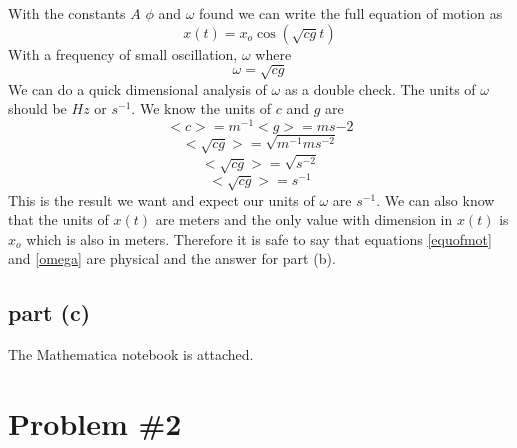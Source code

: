 \documentclass[11pt]{article}
\numberwithin{equation}{section}
\begin{document}
With the constants $A$ $\phi$ and $\omega$ found we can write the full equation of motion as
\begin{equation}
x(t) = x_o\cos{(\sqrt{cg}t)}
\label{equofmot}
\end{equation}
With a frequency of small oscillation, $\omega$ where
$$\omega = \sqrt{cg}$$
We can do a quick dimensional analysis of $\omega$ as a double check. The units of $\omega$ should be $Hz$ or $s^{-1}$. We know the units of $c$ and $g$ are
$$<c> = m^{-1} <g> = ms{-2}$$
$$<\sqrt{cg}> = \sqrt{m^{-1}ms^{-2}}$$
$$<\sqrt{cg}> = \sqrt{s^{-2}}$$
$$<\sqrt{cg}> = s^{-1}$$
This is the result we want and expect our units of $\omega$ are $s^{-1}$. We can also know that the units of $x(t)$ are meters and the only value with dimension in $x(t)$ is $x_o$ which is also in meters. Therefore it is safe to say that equations \ref{equofmot} and \ref{omega} are physical and the answer for part (b).
\begin{center}
\end{center}
\subsection{part (c)}
The Mathematica notebook is attached.

\section{Problem \#2}
\end{document}
